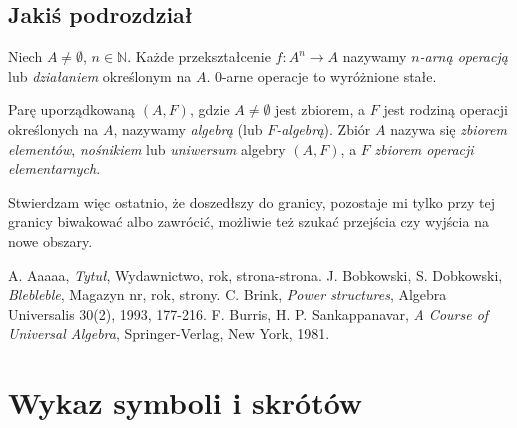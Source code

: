 \documentclass[pl]{minipw} %
\begin{document}
\section{Jakiś podrozdział}


\begin{definition}
Niech $A\neq \emptyset$, $n \in \mathbb{N}$. Każde przekształcenie $f:A^n \rightarrow A$ nazywamy \textit{$n$-arną operacją} lub \textit{działaniem} określonym na $A$.
0-arne operacje to wyróżnione stałe.
\end{definition}


\begin{definition}[Algebra]
Parę uporządkowaną $(A,F)$, gdzie $A\neq \emptyset$ jest zbiorem, a $F$ jest rodziną operacji określonych na $A$, nazywamy \textit{algebrą} (lub \textit{$F$-algebrą}). Zbiór $A$ nazywa się \textit{zbiorem elementów}, \textit{nośnikiem} lub \textit{uniwersum} algebry $(A,F)$, a $F$ \textit{zbiorem operacji elementarnych}.
\end{definition}

\begin{proposition}
Stwierdzam więc ostatnio, że doszedłszy do granicy, pozostaje mi tylko przy tej granicy biwakować albo zawrócić, możliwie też szukać przejścia czy wyjścia na nowe obszary.
\end{proposition}




\begin{thebibliography}{20}%

 A. Aaaaa, \emph{Tytuł}, Wydawnictwo, rok, strona-strona.
 J. Bobkowski, S. Dobkowski, \emph{Blebleble}, Magazyn nr, rok, strony.
 C. Brink, \emph{Power structures}, Algebra Universalis 30(2), 1993, 177-216.
 F. Burris, H. P. Sankappanavar, \emph{A Course of Universal Algebra}, Springer-Verlag, New York, 1981.

\end{thebibliography}



\chapter*{Wykaz symboli i skrótów}
\end{document}
